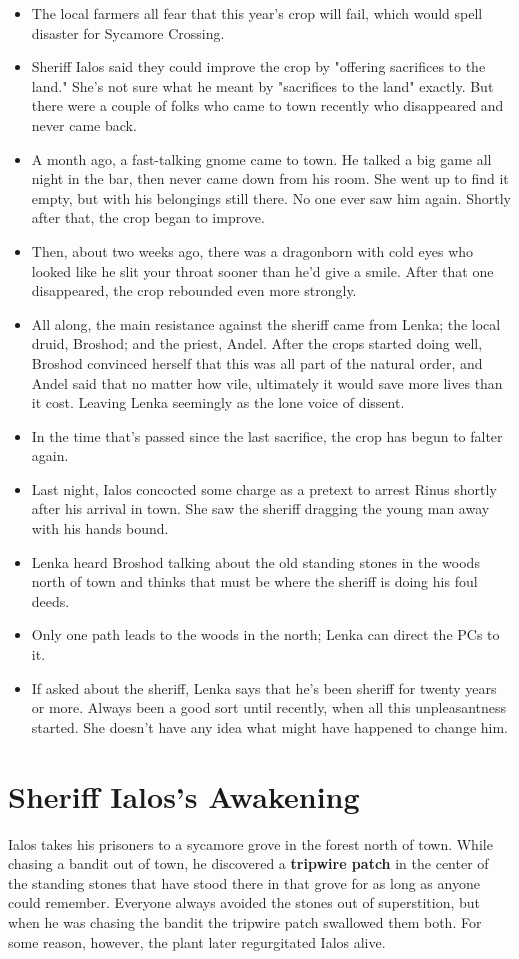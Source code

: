 \documentclass[10pt,a4paper,twoside,bg=print,twocolumn,openany,nodeprecatedcode]{dndbook}
\begin{document}
\begin{itemize}
\item The local farmers all fear that this year's crop will fail, which would spell disaster for Sycamore Crossing.
\item Sheriff Ialos said they could improve the crop by "offering sacrifices to the land." She's not sure what he meant by "sacrifices to the land" exactly. But there were a couple of folks who came to town recently who disappeared and never came back.
\item A month ago, a fast-talking gnome came to town. He talked a big game all night in the bar, then never came down from his room. She went up to find it empty, but with his belongings still there. No one ever saw him again. Shortly after that, the crop began to improve.
\item Then, about two weeks ago, there was a dragonborn with cold eyes who looked like he slit your throat sooner than he'd give a smile. After that one disappeared, the crop rebounded even more strongly.
\item All along, the main resistance against the sheriff came from Lenka; the local druid, Broshod; and the priest, Andel. After the crops started doing well, Broshod convinced herself that this was all part of the natural order, and Andel said that no matter how vile, ultimately it would save more lives than it cost. Leaving Lenka seemingly as the lone voice of dissent.
\item In the time that's passed since the last sacrifice, the crop has begun to falter again.
\item Last night, Ialos concocted some charge as a pretext to arrest Rinus shortly after his arrival in town. She saw the sheriff dragging the young man away with his hands bound.
\item Lenka heard Broshod talking about the old standing stones in the woods north of town and thinks that must be where the sheriff is doing his foul deeds.
\item Only one path leads to the woods in the north; Lenka can direct the PCs to it.
\item If asked about the sheriff, Lenka says that he's been sheriff for twenty years or more. Always been a good sort until recently, when all this unpleasantness started. She doesn't have any idea what might have happened to change him.
\end{itemize}

\section{Sheriff Ialos's Awakening}
Ialos takes his prisoners to a sycamore grove in the forest north of town. While chasing a bandit out of town, he discovered a \textbf{tripwire patch} in the center of the standing stones that have stood there in that grove for as long as anyone could remember. Everyone always avoided the stones out of superstition, but when he was chasing the bandit the tripwire patch swallowed them both. For some reason, however, the plant later regurgitated Ialos alive.
\end{document}
